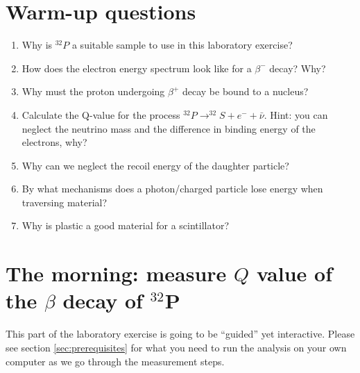 \documentclass[a4,11pt, notitlepage]{article}
\begin{document}
\section{Warm-up questions}

\begin{enumerate}
\item Why is $^{32}P$ a suitable sample to use in this laboratory exercise?
\item How does the electron energy spectrum look like for a $\beta^-$ decay? Why? 
\item Why must the proton undergoing $\beta^+$ decay be bound to a nucleus?
\item Calculate the Q-value for the process $^{32}P\rightarrow ^{32}S + e^- + \bar{\nu}$. Hint: you can neglect the neutrino mass and the difference in binding energy of the electrons, why? 
\item Why can we neglect the recoil energy of the daughter particle?
\item By what mechanisms does a photon/charged particle lose energy
  when traversing material?
\item Why is plastic a good material for a scintillator?
\end{enumerate}


\section{The morning: measure $Q$ value of the $\beta$ decay of $^{32}$P}
This part of the laboratory exercise is going to be ``guided'' yet
interactive. Please see section \ref{sec:prerequisites} for what you
need to run the analysis on your own computer as we go through the measurement steps.
\end{document}
